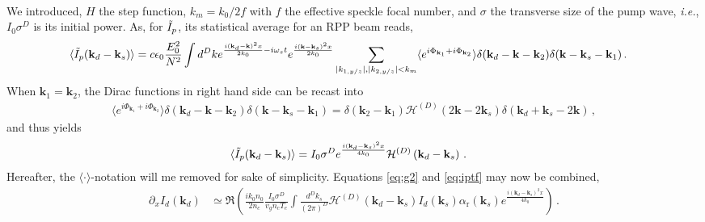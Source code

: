 \documentclass[
 reprint,
 amsmath,amssymb,
 aps,
]{revtex4-1}
\begin{document}
\begin{widetext}
\begin{align}
   \end{align}
We introduced,  $H$ the step function, $k_m=k_0/2f$ with $f$ the effective speckle focal number,  and $\sigma$ the transverse size of the pump wave, \emph{i.e.}, $I_0\sigma^D$ is its initial power.
As, for $\Tilde{I}_p$, its statistical average for an RPP beam reads, 
\begin{align}
\langle \Tilde{I}_p(\mathbf{k}_d-\mathbf{k}_s)\rangle   &=  c\epsilon_0\frac{E_0^2}{N^2}  \int d^Dk 
e^{\frac{ i (\mathbf{k}_d-\mathbf{k})^2x}{2k_0}-i\omega_s t}
e^{\frac{ i(\mathbf{k}-\mathbf{k}_s)^2x}{2k_0}}  
\sum_{\vert k_{1,y/z}\vert,\vert k_{2,y/z}\vert  <k_m}
\langle e^{i\Phi_{\mathbf{k}_1}+i\Phi_{\mathbf{k}_2}}\rangle
\delta(\mathbf{k}_d-\mathbf{k} -\mathbf{k}_2 ) 
\delta(\mathbf{k}-\mathbf{k}_s -\mathbf{k}_1) 
\, . \label{eq:ipt2} 
\end{align}
When  $\mathbf{k}_1=\mathbf{k}_2$, the Dirac functions in right hand side can be recast into 
\begin{align}
\langle e^{i\Phi_{\mathbf{k}_1}+i\Phi_{\mathbf{k}_2}}\rangle\delta(\mathbf{k}_d-\mathbf{k} -\mathbf{k}_2 ) 
\delta(\mathbf{k}-\mathbf{k}_s -\mathbf{k}_1)=
\delta(\mathbf{k}_2 -\mathbf{k}_1)
\mathcal{H}^{(D)}(2\mathbf{k}-2\mathbf{k}_s  )  \delta (\mathbf{k}_d+\mathbf{k}_s -2\mathbf{k} ) \, ,
\end{align}
and thus yields
\begin{align}
\langle \Tilde{I}_p(\mathbf{k}_d-\mathbf{k}_s)\rangle   &=  I_0\sigma^D
e^{\frac{ i(\mathbf{k}_d-\mathbf{k}_s)^2x}{4k_0}}  
\mathcal{H}^{(D)}\left( \mathbf{k}_d-\mathbf{k}_s  \right)
\, . \label{eq:iptf} 
\end{align}
Hereafter, the $\langle  \cdot \rangle$-notation will  me removed for sake of simplicity. 
Equations \eqref{eq:g2} and \eqref{eq:iptf} may now be combined,  
  \begin{align}
\partial_xI_d(\mathbf{k}_d)&\simeq  \Re\left( \frac{ik_0n_0}{2n_c} \frac{ I_0\sigma^D }{  v_g n_c T_e}   
 \int \frac{d^Dk_s}{(2\pi)^D}   \mathcal{H}^{(D)}(\mathbf{k}_d-\mathbf{k}_s) I_d(\mathbf{k}_s) \alpha_\mathrm{r}(\mathbf{k}_s) e^{\frac{ i(\mathbf{k}_d-\mathbf{k}_s)^2x}{4k_0}}  
 \right)
\, . \label{eq:g4}
\end{align}


\end{widetext}
\end{document}
